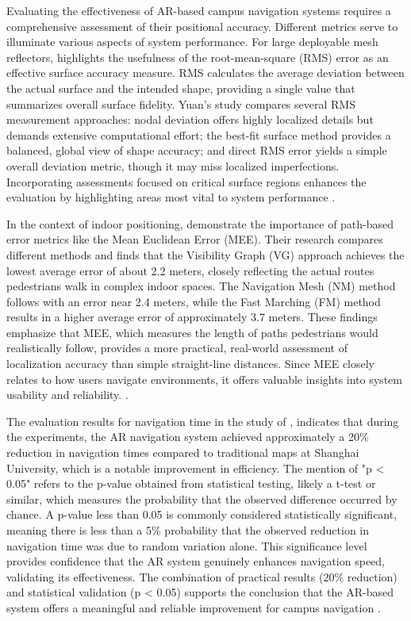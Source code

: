 \begin{refsection}
Evaluating the effectiveness of AR-based campus navigation systems requires a comprehensive assessment of their positional accuracy. Different metrics serve to illuminate various aspects of system performance. For large deployable mesh reflectors, \citeauthor{thirtyseven} \citeyear{thirtyseven} highlights the usefulness of the root-mean-square (RMS) error as an effective surface accuracy measure. RMS calculates the average deviation between the actual surface and the intended shape, providing a single value that summarizes overall surface fidelity. Yuan's study compares several RMS measurement approaches: nodal deviation offers highly localized details but demands extensive computational effort; the best-fit surface method provides a balanced, global view of shape accuracy; and direct RMS error yields a simple overall deviation metric, though it may miss localized imperfections. Incorporating assessments focused on critical surface regions enhances the evaluation by highlighting areas most vital to system performance \cite{thirtysix}. 

In the context of indoor positioning, \citeauthor{thirtyseven} \citeyear{thirtyseven} demonstrate the importance of path-based error metrics like the Mean Euclidean Error (MEE). Their research compares different methods and finds that the Visibility Graph (VG) approach achieves the lowest average error of about 2.2 meters, closely reflecting the actual routes pedestrians walk in complex indoor spaces. The Navigation Mesh (NM) method follows with an error near 2.4 meters, while the Fast Marching (FM) method results in a higher average error of approximately 3.7 meters. These findings emphasize that MEE, which measures the length of paths pedestrians would realistically follow, provides a more practical, real-world assessment of localization accuracy than simple straight-line distances. Since MEE closely relates to how users navigate environments, it offers valuable insights into system usability and reliability.  \cite{thirtyseven}. 

The evaluation results for navigation time in the study of \citeauthor{one} \citeyear{one}, indicates that during the experiments, the AR navigation system achieved approximately a 20\% reduction in navigation times compared to traditional maps at Shanghai University, which is a notable improvement in efficiency. The mention of "p < 0.05" refers to the p-value obtained from statistical testing, likely a t-test or similar, which measures the probability that the observed difference occurred by chance. A p-value less than 0.05 is commonly considered statistically significant, meaning there is less than a 5\% probability that the observed reduction in navigation time was due to random variation alone. This significance level provides confidence that the AR system genuinely enhances navigation speed, validating its effectiveness. The combination of practical results (20\% reduction) and statistical validation (p < 0.05) supports the conclusion that the AR-based system offers a meaningful and reliable improvement for campus navigation \cite{one}. 



\end{refsection}
